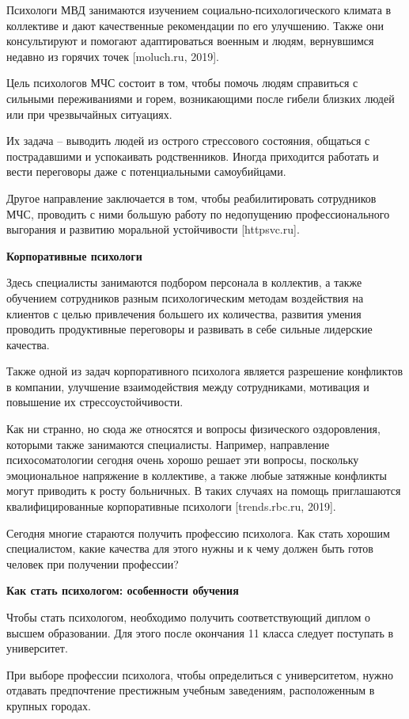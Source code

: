 Психологи МВД занимаются изучением социально-психологического климата в коллективе и дают качественные рекомендации по его улучшению. Также они консультируют и помогают адаптироваться военным и людям, вернувшимся недавно из горячих точек [moluch.ru, 2019].

Цель психологов МЧС состоит в том, чтобы помочь людям справиться с сильными переживаниями и горем, возникающими после гибели близких людей или при чрезвычайных ситуациях.

Их задача – выводить людей из острого стрессового состояния, общаться с пострадавшими и успокаивать родственников. Иногда приходится работать и вести переговоры даже с потенциальными самоубийцами.

Другое направление заключается в том, чтобы реабилитировать сотрудников МЧС, проводить с ними большую работу по недопущению профессионального выгорания и развитию моральной устойчивости [httpsvc.ru].

\textbf{Корпоративные психологи}

Здесь специалисты занимаются подбором персонала в коллектив, а также обучением сотрудников разным психологическим методам воздействия на клиентов с целью привлечения большего их количества, развития умения проводить продуктивные переговоры и развивать в себе сильные лидерские качества.

Также одной из задач корпоративного психолога является разрешение конфликтов в компании, улучшение взаимодействия между сотрудниками, мотивация и повышение их стрессоустойчивости.

Как ни странно, но сюда же относятся и вопросы физического оздоровления, которыми также занимаются специалисты. Например, направление психосоматологии сегодня очень хорошо решает эти вопросы, поскольку эмоциональное напряжение в коллективе, а также любые затяжные конфликты могут приводить к росту больничных. В таких случаях на помощь приглашаются квалифицированные корпоративные психологи [trends.rbc.ru, 2019].

Сегодня многие стараются получить профессию психолога. Как стать хорошим специалистом, какие качества для этого нужны и к чему должен быть готов человек при получении профессии?

\textbf{Как стать психологом: особенности обучения}

Чтобы стать психологом, необходимо получить соответствующий диплом о высшем образовании. Для этого после окончания 11 класса следует поступать в университет.

При выборе профессии психолога, чтобы определиться с университетом, нужно отдавать предпочтение престижным учебным заведениям, расположенным в крупных городах.

